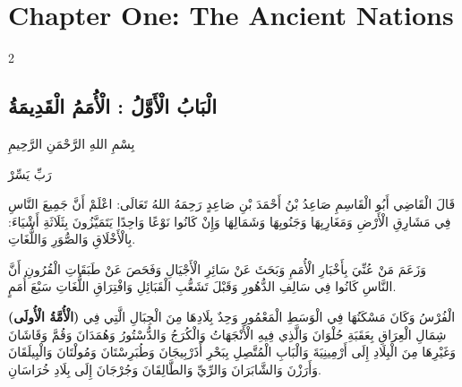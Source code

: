 \documentclass[11pt,a4paper]{article}
\newcommand{\ar}[1]{{\arabicfont\beginR #1\endR}}
\begin{document}
\clearpage

\section*{Chapter One: The Ancient Nations}

\begin{paracol}{2}
\sloppy

\begin{leftcolumn}
\subsection*{\ar{الْبَابُ الْأَوَّلُ : الْأُمَمُ الْقَدِيمَةُ}}
\vspace{0.3cm}
{\arabicfont\beginR
بِسْمِ اللهِ الرَّحْمَنِ الرَّحِيمِ
\endR}

\vspace{0.2cm}
{\arabicfont\beginR
رَبِّ يَسِّرْ
\endR}

\vspace{0.4cm}
{\arabicfont\beginR
قَالَ الْقَاضِي أَبُو الْقَاسِمِ صَاعِدُ بْنُ أَحْمَدَ بْنِ صَاعِدٍ رَحِمَهُ اللهُ تَعَالَى: اعْلَمْ أَنَّ جَمِيعَ النَّاسِ فِي مَشَارِقِ الْأَرْضِ وَمَغَارِبِهَا وَجَنُوبِهَا وَشَمَالِهَا وَإِنْ كَانُوا نَوْعًا وَاحِدًا يَتَمَيَّزُونَ بِثَلَاثَةِ أَشْيَاءَ: بِالْأَخْلَاقِ وَالصُّوَرِ وَاللُّغَاتِ.
\endR}

\vspace{0.3cm}
{\arabicfont\beginR
وَزَعَمَ مَنْ عُنِّيَ بِأَخْبَارِ الْأُمَمِ وَبَحَثَ عَنْ سَائِرِ الْأَجْيَالِ وَفَحَصَ عَنْ طَبَقَاتِ الْقُرُونِ أَنَّ النَّاسِ كَانُوا فِي سَالِفِ الدُّهُورِ وَقَبْلَ تَشَعُّبِ الْقَبَائِلِ وَافْتِرَاقِ اللُّغَاتِ سَبْعَ أُمَمٍ.
\endR}

\vspace{0.3cm}
{\arabicfont\beginR
\textbf{(الْأُمَّةُ الْأُولَى)} الْفُرْسُ وَكَانَ مَسْكَنُهَا فِي الْوَسَطِ الْمَعْمُورِ وَحِدٌ بِلَادِهَا مِنَ الْجِبَالِ الَّتِي فِي شِمَالِ الْعِرَاقِ بِعَقَبَةِ حُلْوَانَ وَالَّذِي فِيهِ الْأَنْجَهَاتُ وَالْكُرَجُ وَالدُّسْتُورُ وَهُمَدَانَ وَقُمَّ وَقَاشَانَ وَغَيْرِهَا مِنَ الْبِلَادِ إِلَى أَرْمِينِيَةَ وَالْبَابِ الْمُتَّصِلِ بِبَحْرِ أَذَرْبِيجَانَ وَطُبَرِسْتَانَ وَمُولْتَانَ وَالْبِيلَقَانَ وَأَرَزْنَ وَالشَّابَرَانَ وَالرِّيِّ وَالطَّالِقَانَ وَجُرْجَانَ إِلَى بِلَادِ خُرَاسَانِ.
\endR}
\end{leftcolumn}


\end{paracol}
\end{document}
